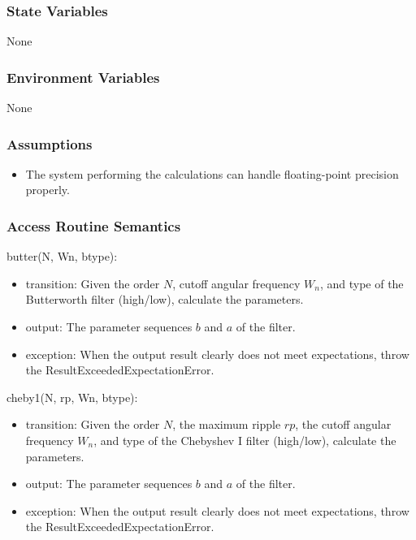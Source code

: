 \documentclass[12pt, titlepage]{article}
\begin{document}
\subsubsection{State Variables}

None

\subsubsection{Environment Variables}

None

\subsubsection{Assumptions}

\begin{itemize}
\item The system performing the calculations can handle floating-point precision
properly.
\end{itemize}

\subsubsection{Access Routine Semantics}

\noindent butter(N, Wn, btype):
\begin{itemize}
\item transition: Given the order $N$, cutoff angular frequency $W_n$, and type
of the Butterworth filter (high/low), calculate the parameters.
\item output: The parameter sequences $b$ and $a$ of the filter.
\item exception: When the output result clearly does not meet expectations,
throw the ResultExceededExpectationError.
\end{itemize}

\noindent cheby1(N, rp, Wn, btype):
\begin{itemize}
\item transition: Given the order $N$, the maximum ripple $rp$, the cutoff
angular frequency $W_n$, and type of the Chebyshev I filter (high/low),
calculate the parameters.
\item output: The parameter sequences $b$ and $a$ of the filter.
\item exception: When the output result clearly does not meet expectations,
throw the ResultExceededExpectationError.
\end{itemize}
\end{document}

